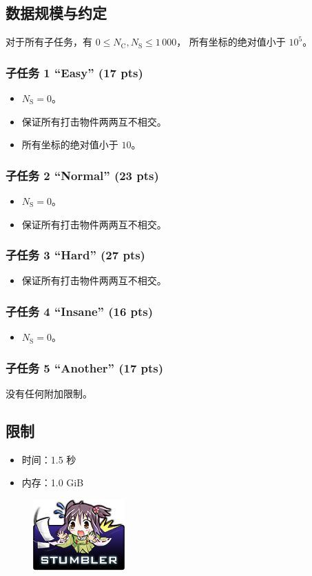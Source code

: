 \documentclass[UTF8, 11pt, a4paper]{article}
\begin{document}
\subsection*{数据规模与约定}
对于所有子任务，有 $0 \leq N_\mathrm{C}, N_\mathrm{S} \leq 1\,000$，%
所有坐标的绝对值小于 $10^5$。
\subsubsection*{子任务 1 “Easy” (17 pts)}
\begin{itemize}
    \item $N_\mathrm{S} = 0$。
    \item 保证所有打击物件两两互不相交。
    \item 所有坐标的绝对值小于 $10$。
\end{itemize}
\subsubsection*{子任务 2 “Normal” (23 pts)}
\begin{itemize}
    \item $N_\mathrm{S} = 0$。
    \item 保证所有打击物件两两互不相交。
\end{itemize}
\subsubsection*{子任务 3 “Hard” (27 pts)}
\begin{itemize}
    \item 保证所有打击物件两两互不相交。
\end{itemize}
\subsubsection*{子任务 4 “Insane” (16 pts)}
\begin{itemize}
    \item $N_\mathrm{S} = 0$。
\end{itemize}
\subsubsection*{子任务 5 “Another” (17 pts)}
    没有任何附加限制。

\subsection*{限制}
\begin{itemize}
\item 时间：1.5 秒
\item 内存：1.0 GiB
\end{itemize}

\begin{figure}[h]\centering
\includegraphics[scale=0.55]{stumbler.png}
\end{figure}
\end{document}

